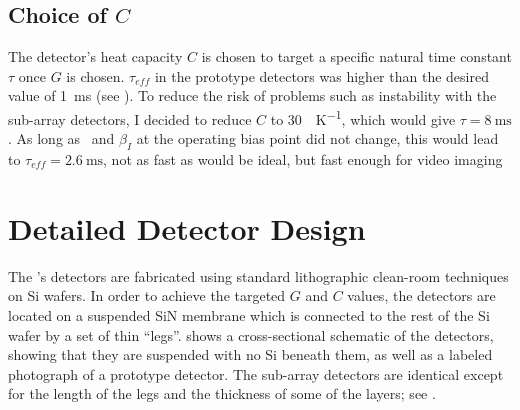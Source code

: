 \subsection{Choice of $C$}

The detector's heat capacity $C$ is chosen to target a specific natural time constant $\tau$ once $G$ is chosen.
$\tau_{eff}$ in the prototype detectors was higher than the desired value of \SI{1}{\ms} (see ).
To reduce the risk of problems such as instability with the sub-array detectors, I decided to reduce $C$ to \SI{30}{\pJ\per\K}, which would give $\tau = \SI{8}{\ms}$.
As long as \Loop\ and $\beta_I$ at the operating bias point did not change, this would lead to $\tau_{eff} = \SI{2.6}{\ms}$, not as fast as would be ideal, but fast enough for video imaging

\section{Detailed Detector Design} \label{sec:ch5-det-design}

The \Imager's detectors are fabricated using standard lithographic clean-room techniques on Si wafers.
In order to achieve the targeted $G$ and $C$ values, the detectors are located on a suspended SiN membrane which is connected to the rest of the Si wafer by a set of thin ``legs''.
 shows a cross-sectional schematic of the detectors, showing that they are suspended with no Si beneath them, as well as a labeled photograph of a prototype detector.
The sub-array detectors are identical except for the length of the legs and the thickness of some of the layers; see .

